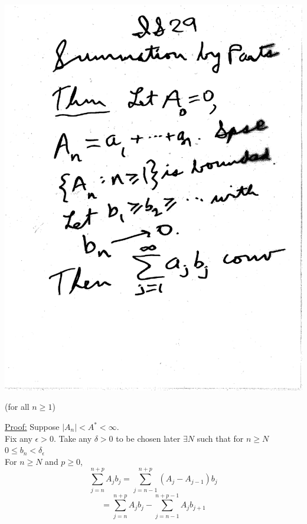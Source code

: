 \documentclass[10pt,a4paper]{article}
\begin{document}
{{\includegraphics[scale=.5]{Pages/IS_29}

\newpage

\begin{center}
(for all $n\geq 1$)
\end{center}
\vspace{3mm}
\noindent \underline{Proof:} Suppose $|A_n| < A^* <\infty$.
\\Fix any $\epsilon > 0$. Take any $\delta > 0$ to be chosen later $\exists  N$ such that for $n\geq N$ $0 \leq b_n < \delta_\epsilon$
\\ For $n \geq N$ and $p \geq 0$,
$$ \sum_{j=n}^{n+p} A_j b_j = \sum_{j=n-1}^{n+p} (A_j - A_{j-1}) b_j$$ 
$$= \sum_{j=n}^{n+p} A_j b_j - \sum_{j=n-1}^{n+p-1} A_j b_{j+1}$$

}}
\end{document}
